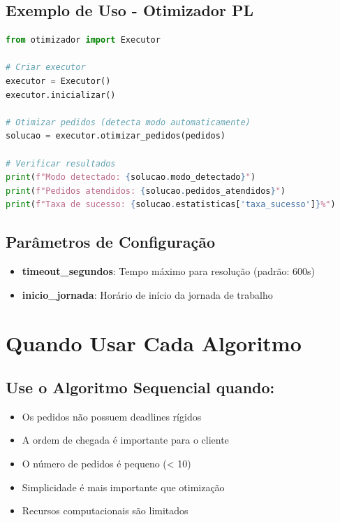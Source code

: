 \documentclass[12pt,a4paper]{article}
\begin{document}
\subsection{Exemplo de Uso - Otimizador PL}

\begin{lstlisting}[language=Python, basicstyle=\ttfamily\small]
from otimizador import Executor

# Criar executor
executor = Executor()
executor.inicializar()

# Otimizar pedidos (detecta modo automaticamente)
solucao = executor.otimizar_pedidos(pedidos)

# Verificar resultados
print(f"Modo detectado: {solucao.modo_detectado}")
print(f"Pedidos atendidos: {solucao.pedidos_atendidos}")
print(f"Taxa de sucesso: {solucao.estatisticas['taxa_sucesso']}%")
\end{lstlisting}

\subsection{Parâmetros de Configuração}

\begin{itemize}
    \item \textbf{timeout\_segundos}: Tempo máximo para resolução (padrão: 600s)
    \item \textbf{inicio\_jornada}: Horário de início da jornada de trabalho
\end{itemize}

\section{Quando Usar Cada Algoritmo}

\subsection{Use o Algoritmo Sequencial quando:}

\begin{itemize}
    \item Os pedidos não possuem deadlines rígidos
    \item A ordem de chegada é importante para o cliente
    \item O número de pedidos é pequeno (< 10)
    \item Simplicidade é mais importante que otimização
    \item Recursos computacionais são limitados
\end{itemize}
\end{document}
